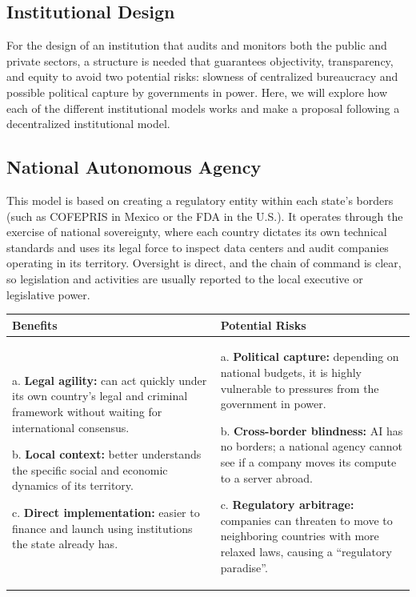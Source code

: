 \subsection{Institutional Design}

For the design of an institution that audits and monitors both the public and private sectors, a structure is needed that guarantees objectivity, transparency, and equity to avoid two potential risks: slowness of centralized bureaucracy and possible political capture by governments in power. Here, we will explore how each of the different institutional models works and make a proposal following a decentralized institutional model.

\subsection*{National Autonomous Agency}

This model is based on creating a regulatory entity within each state's borders (such as COFEPRIS in Mexico or the FDA in the U.S.). It operates through the exercise of national sovereignty, where each country dictates its own technical standards and uses its legal force to inspect data centers and audit companies operating in its territory. Oversight is direct, and the chain of command is clear, so legislation and activities are usually reported to the local executive or legislative power.

\begin{table}[h]
\centering
\begin{tabular}{|p{5cm}|p{5cm}|}
\hline
\textbf{Benefits} & \textbf{Potential Risks} \\
\hline
a. \textbf{Legal agility:} can act quickly under its own country's legal and criminal framework without waiting for international consensus.

\vspace{0.2cm}
b. \textbf{Local context:} better understands the specific social and economic dynamics of its territory.

\vspace{0.2cm}
c. \textbf{Direct implementation:} easier to finance and launch using institutions the state already has. 
& 
a. \textbf{Political capture:} depending on national budgets, it is highly vulnerable to pressures from the government in power.

\vspace{0.2cm}
b. \textbf{Cross-border blindness:} AI has no borders; a national agency cannot see if a company moves its compute to a server abroad.

\vspace{0.2cm}
c. \textbf{Regulatory arbitrage:} companies can threaten to move to neighboring countries with more relaxed laws, causing a ``regulatory paradise''. \\
\hline
\end{tabular}
\end{table}


